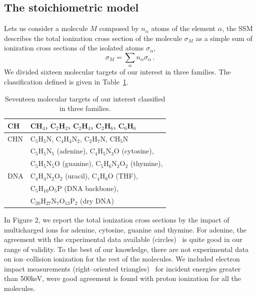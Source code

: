 \documentclass[preprint,12pt]{article}
\begin{document}
\subsection{The stoichiometric model}

Lets us consider a molecule $M$ composed by $n_{\alpha}$ atoms of the
element $\alpha$, the SSM describes the total ionization cross section 
of the molecule $\sigma_{M}$ as a simple sum of ionization cross 
sections of the isolated atoms $\sigma_{\alpha}$, 
\begin{equation}
 \sigma_{M}=\sum\limits_{\alpha}n_{\alpha}\sigma_{\alpha}\,.  
 \label{eq:sumion}
\end{equation}
We divided sixteen molecular targets of our interest in three families. 
The classification defined is given in Table~\ref{tab:families}.
\begin{table}
\begin{center}
\begin{tabular}{|p{}|p{}|}
\hline
 CH  & CH$_4$, C$_2$H$_2$, C$_2$H$_4$, C$_2$H$_6$, C$_6$H$_6$ \\
\hline
 CHN & C$_5$H$_5$N, C$_4$H$_4$N$_2$, C$_2$H$_7$N, CH$_5$N \\
\hline
 \multirow{5}{*}{DNA} 
     & C$_5$H$_5$N$_5$ (adenine), C$_4$H$_5$N$_3$O (cytosine), \\
     & C$_5$H$_5$N$_5$O (guanine), C$_5$H$_6$N$_2$O$_2$ (thymine), \\
     & C$_4$H$_4$N$_2$O$_2$ (uracil), C$_4$H$_8$O (THF), \\
     & C$_5$H$_{10}$O$_5$P (DNA backbone), \\
     & C$_{20}$H$_{27}$N$_7$O$_{13}$P$_2$ (dry DNA) \\
\hline
\end{tabular}
\caption{Seventeen molecular targets of our interest classified in three 
families.}
\label{tab:families}
\end{center}
\end{table}

In Figure 2, we report the total ionization cross sections by the 
impact of multicharged ions for adenine, cytosine, guanine and thymine. 
For adenine, the agreement with the experimental data 
available (circles)~\cite{iriki2011} is quite good in our range of validity. 
To the best of our knowledge, there are not experimental data on 
ion--collision ionization for the rest of the molecules. We included 
electron impact measurements (right--oriented triangles)~\cite{mozejko2003} 
for incident energies greater than 500keV, were good agreement is found 
with proton ionization for all the molecules. 
\end{document}
